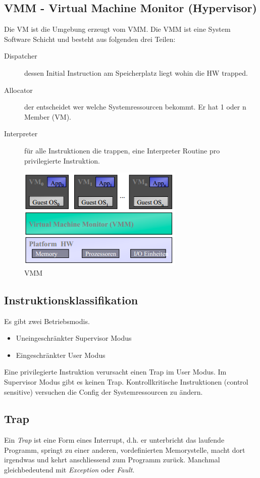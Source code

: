 \subsection{VMM - Virtual Machine Monitor (Hypervisor)}
\label{sec:vmm-virtual-machine-monitor}
Die VM ist die Umgebung erzeugt vom VMM. Die VMM ist eine System Software Schicht und besteht aus folgenden drei Teilen:
\begin{description}
	\item[Dispatcher] dessen Initial Instruction am Speicherplatz liegt wohin die HW trapped.
	\item[Allocator] der entscheidet wer welche Systemressourcen bekommt. Er hat 1 oder n Member (VM).
	\item[Interpreter] für alle Instruktionen die trappen, eine Interpreter Routine pro privilegierte Instruktion.
\end{description}

\begin{figure}[h!]
	\centering
	\includegraphics[width=0.4\linewidth]{fig/vmm}
	\caption{VMM}
	\label{fig:vmm}
\end{figure}

\subsection{Instruktionsklassifikation}
Es gibt zwei Betriebsmodis.
\begin{itemize}
	\item Uneingeschränkter Supervisor Modus
	\item Eingeschränkter User Modus
\end{itemize}
Eine privilegierte Instruktion verursacht einen Trap im User Modus. Im Supervisor Modus gibt es keinen Trap. Kontrollkritische Instruktionen (control sensitive) versuchen die Config der Systemressourcen zu ändern.

\subsection{Trap}
Ein \textit{Trap} ist eine Form eines Interrupt, d.h. er unterbricht das laufende Programm, springt zu einer anderen, vordefinierten Memorystelle, macht dort irgendwas und kehrt anschliessend zum Programm zurück. Manchmal gleichbedeutend mit \textit{Exception} oder \textit{Fault}.

